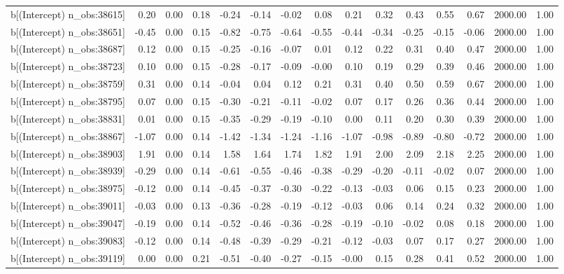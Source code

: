 \begin{table}[ht]
\begin{tabular}{rrrrrrrrrrrrrrr}
  b[(Intercept) n\_obs:38615] & 0.20 & 0.00 & 0.18 & -0.24 & -0.14 & -0.02 & 0.08 & 0.21 & 0.32 & 0.43 & 0.55 & 0.67 & 2000.00 & 1.00 \\ 
  b[(Intercept) n\_obs:38651] & -0.45 & 0.00 & 0.15 & -0.82 & -0.75 & -0.64 & -0.55 & -0.44 & -0.34 & -0.25 & -0.15 & -0.06 & 2000.00 & 1.00 \\ 
  b[(Intercept) n\_obs:38687] & 0.12 & 0.00 & 0.15 & -0.25 & -0.16 & -0.07 & 0.01 & 0.12 & 0.22 & 0.31 & 0.40 & 0.47 & 2000.00 & 1.00 \\ 
  b[(Intercept) n\_obs:38723] & 0.10 & 0.00 & 0.15 & -0.28 & -0.17 & -0.09 & -0.00 & 0.10 & 0.19 & 0.29 & 0.39 & 0.46 & 2000.00 & 1.00 \\ 
  b[(Intercept) n\_obs:38759] & 0.31 & 0.00 & 0.14 & -0.04 & 0.04 & 0.12 & 0.21 & 0.31 & 0.40 & 0.50 & 0.59 & 0.67 & 2000.00 & 1.00 \\ 
  b[(Intercept) n\_obs:38795] & 0.07 & 0.00 & 0.15 & -0.30 & -0.21 & -0.11 & -0.02 & 0.07 & 0.17 & 0.26 & 0.36 & 0.44 & 2000.00 & 1.00 \\ 
  b[(Intercept) n\_obs:38831] & 0.01 & 0.00 & 0.15 & -0.35 & -0.29 & -0.19 & -0.10 & 0.00 & 0.11 & 0.20 & 0.30 & 0.39 & 2000.00 & 1.00 \\ 
  b[(Intercept) n\_obs:38867] & -1.07 & 0.00 & 0.14 & -1.42 & -1.34 & -1.24 & -1.16 & -1.07 & -0.98 & -0.89 & -0.80 & -0.72 & 2000.00 & 1.00 \\ 
  b[(Intercept) n\_obs:38903] & 1.91 & 0.00 & 0.14 & 1.58 & 1.64 & 1.74 & 1.82 & 1.91 & 2.00 & 2.09 & 2.18 & 2.25 & 2000.00 & 1.00 \\ 
  b[(Intercept) n\_obs:38939] & -0.29 & 0.00 & 0.14 & -0.61 & -0.55 & -0.46 & -0.38 & -0.29 & -0.20 & -0.11 & -0.02 & 0.07 & 2000.00 & 1.00 \\ 
  b[(Intercept) n\_obs:38975] & -0.12 & 0.00 & 0.14 & -0.45 & -0.37 & -0.30 & -0.22 & -0.13 & -0.03 & 0.06 & 0.15 & 0.23 & 2000.00 & 1.00 \\ 
  b[(Intercept) n\_obs:39011] & -0.03 & 0.00 & 0.13 & -0.36 & -0.28 & -0.19 & -0.12 & -0.03 & 0.06 & 0.14 & 0.24 & 0.32 & 2000.00 & 1.00 \\ 
  b[(Intercept) n\_obs:39047] & -0.19 & 0.00 & 0.14 & -0.52 & -0.46 & -0.36 & -0.28 & -0.19 & -0.10 & -0.02 & 0.08 & 0.18 & 2000.00 & 1.00 \\ 
  b[(Intercept) n\_obs:39083] & -0.12 & 0.00 & 0.14 & -0.48 & -0.39 & -0.29 & -0.21 & -0.12 & -0.03 & 0.07 & 0.17 & 0.27 & 2000.00 & 1.00 \\ 
  b[(Intercept) n\_obs:39119] & 0.00 & 0.00 & 0.21 & -0.51 & -0.40 & -0.27 & -0.15 & -0.00 & 0.15 & 0.28 & 0.41 & 0.52 & 2000.00 & 1.00 \\ 

\end{tabular}
\end{table}
